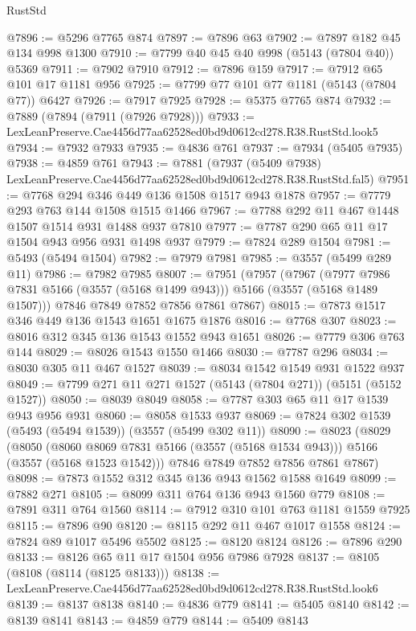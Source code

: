\begin{lexlean}{RustStd}
\begin{coremodule}
@7896 := @5296 @7765 @874
@7897 := @7896 @63
@7902 := @7897 @182 @45 @134 @998 @1300
@7910 := @7799 @40 @45 @40 @998 (@5143 (@7804 @40)) @5369
@7911 := @7902 @7910
@7912 := @7896 @159
@7917 := @7912 @65 @101 @17 @1181 @956
@7925 := @7799 @77 @101 @77 @1181 (@5143 (@7804 @77)) @6427
@7926 := @7917 @7925
@7928 := @5375 @7765 @874
@7932 := @7889 (@7894 (@7911 (@7926 @7928)))
@7933 := LexLeanPreserve.Cae4456d77aa62528ed0bd9d0612cd278.R38.RustStd.look5
@7934 := @7932 @7933
@7935 := @4836 @761
@7937 := @7934 (@5405 @7935)
@7938 := @4859 @761
@7943 := @7881
    (@7937 (@5409 @7938) LexLeanPreserve.Cae4456d77aa62528ed0bd9d0612cd278.R38.RustStd.fal5)
@7951 := @7768 @294 @346 @449 @136 @1508 @1517 @943 @1878
@7957 := @7779 @293 @763 @144 @1508 @1515 @1466
@7967 := @7788 @292 @11 @467 @1448 @1507 @1514 @931 @1488 @937 @7810
@7977 := @7787 @290 @65 @11 @17 @1504 @943 @956 @931 @1498 @937
@7979 := @7824 @289 @1504
@7981 := @5493 (@5494 @1504)
@7982 := @7979 @7981
@7985 := @3557 (@5499 @289 @11)
@7986 := @7982 @7985
@8007 := @7951
    (@7957
      (@7967 (@7977 @7986 @7831 @5166 (@3557 (@5168 @1499 @943))) @5166 (@3557 (@5168 @1489 @1507)))
      @7846
      @7849
      @7852
      @7856
      @7861
      @7867)
@8015 := @7873 @1517 @346 @449 @136 @1543 @1651 @1675 @1876
@8016 := @7768 @307
@8023 := @8016 @312 @345 @136 @1543 @1552 @943 @1651
@8026 := @7779 @306 @763 @144
@8029 := @8026 @1543 @1550 @1466
@8030 := @7787 @296
@8034 := @8030 @305 @11 @467 @1527
@8039 := @8034 @1542 @1549 @931 @1522 @937
@8049 := @7799 @271 @11 @271 @1527 (@5143 (@7804 @271)) (@5151 (@5152 @1527))
@8050 := @8039 @8049
@8058 := @7787 @303 @65 @11 @17 @1539 @943 @956 @931
@8060 := @8058 @1533 @937
@8069 := @7824 @302 @1539 (@5493 (@5494 @1539)) (@3557 (@5499 @302 @11))
@8090 := @8023
    (@8029
      (@8050 (@8060 @8069 @7831 @5166 (@3557 (@5168 @1534 @943))) @5166 (@3557 (@5168 @1523 @1542)))
      @7846
      @7849
      @7852
      @7856
      @7861
      @7867)
@8098 := @7873 @1552 @312 @345 @136 @943 @1562 @1588 @1649
@8099 := @7882 @271
@8105 := @8099 @311 @764 @136 @943 @1560 @779
@8108 := @7891 @311 @764 @1560
@8114 := @7912 @310 @101 @763 @1181 @1559 @7925
@8115 := @7896 @90
@8120 := @8115 @292 @11 @467 @1017 @1558
@8124 := @7824 @89 @1017 @5496 @5502
@8125 := @8120 @8124
@8126 := @7896 @290
@8133 := @8126 @65 @11 @17 @1504 @956 @7986 @7928
@8137 := @8105 (@8108 (@8114 (@8125 @8133)))
@8138 := LexLeanPreserve.Cae4456d77aa62528ed0bd9d0612cd278.R38.RustStd.look6
@8139 := @8137 @8138
@8140 := @4836 @779
@8141 := @5405 @8140
@8142 := @8139 @8141
@8143 := @4859 @779
@8144 := @5409 @8143

\end{coremodule}
\end{lexlean}
